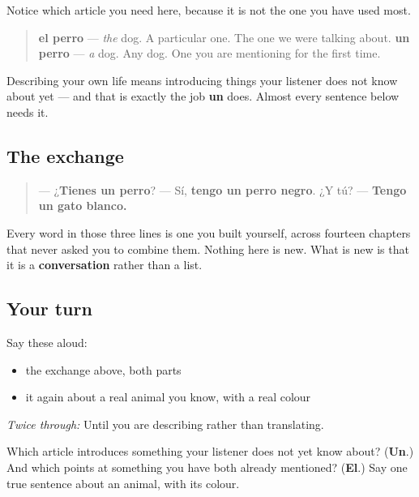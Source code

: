 \begin{grammarlens}[title={Grammar Lens: the word that made this possible}]
Notice which article you need here, because it is not the one you have used most.

\begin{quote}
\textbf{el perro} — \emph{the} dog. A particular one. The one we were talking about. \textbf{un perro} — \emph{a} dog. Any dog. One you are mentioning for the first time.
\end{quote}

Describing your own life means introducing things your listener does not know about yet — and that is exactly the job \textbf{un} does. Almost every sentence below needs it.
\end{grammarlens}

\subsection*{The exchange}
\begin{quote}
— ¿\textbf{Tienes un perro}? — Sí, \textbf{tengo un perro negro}. ¿Y tú? — \textbf{Tengo un gato blanco.}
\end{quote}

Every word in those three lines is one you built yourself, across fourteen chapters that never asked you to combine them. Nothing here is new. What is new is that it is a \textbf{conversation} rather than a list.

\subsection*{Your turn}
Say these aloud:

\begin{itemize}
\raggedright
  \item the exchange above, both parts
  \item it again about a real animal you know, with a real colour
\end{itemize}

\emph{Twice through:} Until you are describing rather than translating.

\begin{tcolorbox}[breakable,colback=teal!4,colframe=teal!35!black,title={Before you move on}]
Which article introduces something your listener does not yet know about? (\textbf{Un}.) And which points at something you have both already mentioned? (\textbf{El}.) Say one true sentence about an animal, with its colour.
\end{tcolorbox}
